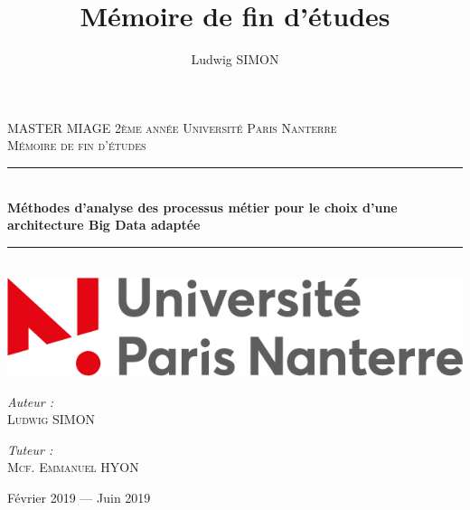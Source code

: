 \documentclass[12pt, twoside, openright]{report}
\author{Ludwig SIMON}
\title{Mémoire de fin d'études}
\begin{document}
%

\setlength{\parindent}{0cm}
\setlength{\parskip}{1ex plus 0.5ex minus 0.2ex}
\newcommand{\hsp}{\hspace{20pt}}
\newcommand{\HRule}{\rule{\linewidth}{0.5mm}}

\begin{titlepage}
  \begin{sffamily}
  \begin{center}

    \textsc{\LARGE MASTER MIAGE 2ème année \linebreak Université Paris Nanterre}\\[2cm]

    \textsc{\Large Mémoire de fin d'études}\\[1.5cm]

    \HRule \\[0.4cm]
    { \huge \bfseries Méthodes d'analyse des processus métier pour le choix d'une architecture Big Data adaptée\\[0.4cm] }

    \HRule \\[2cm]
    \includegraphics[scale=0.40]{img/logo_nanterre.jpg}
    \hspace{2cm}
    
    \vfill
  \begin{minipage}{0.4\textwidth}
      \begin{flushleft} \large
        \emph{Auteur :}\\ \textsc{Ludwig SIMON}\\
      \end{flushleft}
    \end{minipage}
    \begin{minipage}{0.4\textwidth}
      \begin{flushright} \large
        \emph{Tuteur :}\\ \textsc{Mcf. Emmanuel HYON}\\
      \end{flushright}
    \end{minipage}
    \vfill
    {\large Février 2019 — Juin 2019}
  \end{center}
  \end{sffamily}
\end{titlepage}
\end{document}
